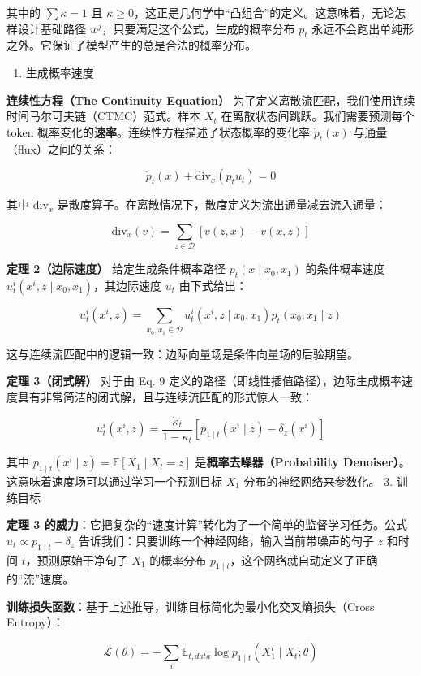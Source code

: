 其中的 \(\sum \kappa=1\) 且 \(\kappa\ge 0\)，这正是几何学中``凸组合''的定义。这意味着，无论怎样设计基础路径 \(w^j\)，只要满足这个公式，生成的概率分布 \(p_t\) 永远不会跑出单纯形之外。它保证了模型产生的总是合法的概率分布。

\begin{enumerate}
\def\labelenumi{\arabic{enumi}.}
\setcounter{enumi}{1}
\tightlist
\item
  生成概率速度
\end{enumerate}

\textbf{连续性方程（The Continuity Equation）} 为了定义离散流匹配，我们使用连续时间马尔可夫链（CTMC）范式。样本 \(X_t\) 在离散状态间跳跃。我们需要预测每个 token 概率变化的\textbf{速率}。连续性方程描述了状态概率的变化率 \(\dot{p}_t(x)\) 与通量（flux）之间的关系：

\[
\dot{p}_t(x)+\mathrm{div}_x(p_tu_t)=0
\]

其中 \(\mathrm{div}_x\) 是散度算子。在离散情况下，散度定义为流出通量减去流入通量：

\[
\mathrm{div}_x(v)=\sum_{z\in\mathcal{D}}[v(z,x)-v(x,z)]
\]

\textbf{定理 2（边际速度）} 给定生成条件概率路径 \(p_t(x\mid x_0,x_1)\) 的条件概率速度 \(u_t^i(x^i,z\mid x_0,x_1)\)，其边际速度 \(u_t\) 由下式给出：

\[
u_t^i(x^i,z)=\sum_{x_0,x_1\in\mathcal{D}}u_t^i(x^i,z\mid x_0,x_1)p_t(x_0,x_1\mid z)
\]

这与连续流匹配中的逻辑一致：边际向量场是条件向量场的后验期望。

\textbf{定理 3（闭式解）} 对于由 Eq. 9 定义的路径（即线性插值路径），边际生成概率速度具有非常简洁的闭式解，且与连续流匹配的形式惊人一致：

\[
u_t^i(x^i,z)=\frac{\dot{\kappa}_t}{1-\kappa_t}[p_{1\mid t}(x^i\mid z)-\delta_z(x^i)]
\]

其中 \(p_{1\mid t}(x^i\mid z)=\mathbb{E}[X_1\mid X_t=z]\) 是\textbf{概率去噪器（Probability Denoiser）}。这意味着速度场可以通过学习一个预测目标 \(X_1\) 分布的神经网络来参数化。
3. 训练目标

\textbf{定理 3 的威力}：它把复杂的``速度计算''转化为了一个简单的监督学习任务。公式 \(u_t\propto p_{1\mid t}-\delta_z\) 告诉我们：只要训练一个神经网络，输入当前带噪声的句子 \(z\) 和时间 \(t\)，预测原始干净句子 \(X_1\) 的概率分布 \(p_{1\mid t}\)，这个网络就自动定义了正确的``流''速度。

\textbf{训练损失函数}：基于上述推导，训练目标简化为最小化交叉熵损失（Cross Entropy）：

\[
\mathcal{L}(\theta)=-\sum_i\mathbb{E}_{t,data}\log p_{1\mid t}(X_1^i\mid X_t;\theta)
\]

